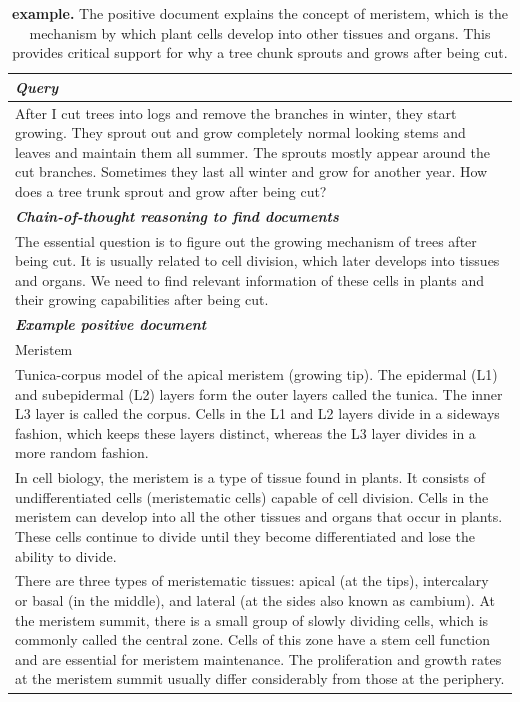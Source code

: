 \begin{table}[ht]
\caption{\textbf{\biology example.} The positive document explains the concept of meristem, which is the mechanism by which plant cells develop into other tissues and organs. This provides critical support for why a tree chunk sprouts and grows after being cut.}
\centering
\begin{tabular}{p{13cm}}
\toprule
\textit{\textbf{Query}} \\
\midrule
After I cut trees into logs and remove the branches in winter, they start growing. They sprout out and grow completely normal looking stems and leaves and maintain them all summer. The sprouts mostly appear around the cut branches. Sometimes they last all winter and grow for another year. How does a tree trunk sprout and grow after being cut?\\
\midrule
\textit{\textbf{Chain-of-thought reasoning to find documents}} \\
\midrule
The essential question is to figure out the growing mechanism of trees after being cut. It is usually related to cell division, which later develops into tissues and organs. We need to find relevant information of these cells in plants and their growing capabilities after being cut. \\
\midrule
\textit{\textbf{Example positive document}} \\
\midrule
Meristem \\
Tunica-corpus model of the apical meristem (growing tip). The epidermal (L1) and subepidermal (L2) layers form the outer layers called the tunica. The inner L3 layer is called the corpus. Cells in the L1 and L2 layers divide in a sideways fashion, which keeps these layers distinct, whereas the L3 layer divides in a more random fashion. \\
In cell biology, the meristem is a type of tissue found in plants. It consists of undifferentiated cells (meristematic cells) capable of cell division. Cells in the meristem can develop into all the other tissues and organs that occur in plants. These cells continue to divide until they become differentiated and lose the ability to divide. \\
There are three types of meristematic tissues: apical (at the tips), intercalary or basal (in the middle), and lateral (at the sides also known as cambium). At the meristem summit, there is a small group of slowly dividing cells, which is commonly called the central zone. Cells of this zone have a stem cell function and are essential for meristem maintenance. The proliferation and growth rates at the meristem summit usually differ considerably from those at the periphery. \\

\end{tabular}
\end{table}
